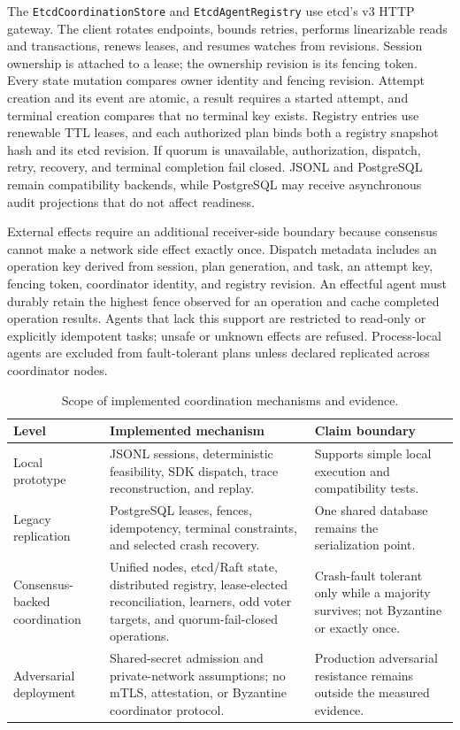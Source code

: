 The \texttt{EtcdCoordinationStore} and \texttt{EtcdAgentRegistry} use etcd's v3 HTTP gateway. The client rotates endpoints, bounds retries, performs linearizable reads and transactions, renews leases, and resumes watches from revisions. Session ownership is attached to a lease; the ownership revision is its fencing token. Every state mutation compares owner identity and fencing revision. Attempt creation and its event are atomic, a result requires a started attempt, and terminal creation compares that no terminal key exists. Registry entries use renewable TTL leases, and each authorized plan binds both a registry snapshot hash and its etcd revision. If quorum is unavailable, authorization, dispatch, retry, recovery, and terminal completion fail closed. JSONL and PostgreSQL remain compatibility backends, while PostgreSQL may receive asynchronous audit projections that do not affect readiness.

External effects require an additional receiver-side boundary because consensus cannot make a network side effect exactly once. Dispatch metadata includes an operation key derived from session, plan generation, and task, an attempt key, fencing token, coordinator identity, and registry revision. An effectful agent must durably retain the highest fence observed for an operation and cache completed operation results. Agents that lack this support are restricted to read-only or explicitly idempotent tasks; unsafe or unknown effects are refused. Process-local agents are excluded from fault-tolerant plans unless declared replicated across coordinator nodes.

\begin{table}[htbp]
\centering
\caption{Scope of implemented coordination mechanisms and evidence.}
\label{tab:implementation-scope}
\small
\begin{tabular}{p{}p{}p{}}
\toprule
\textbf{Level} & \textbf{Implemented mechanism} & \textbf{Claim boundary} \\
\midrule
Local prototype & JSONL sessions, deterministic feasibility, SDK dispatch, trace reconstruction, and replay. & Supports simple local execution and compatibility tests. \\
Legacy replication & PostgreSQL leases, fences, idempotency, terminal constraints, and selected crash recovery. & One shared database remains the serialization point. \\
Consensus-backed coordination & Unified nodes, etcd/Raft state, distributed registry, lease-elected reconciliation, learners, odd voter targets, and quorum-fail-closed operations. & Crash-fault tolerant only while a majority survives; not Byzantine or exactly once. \\
Adversarial deployment & Shared-secret admission and private-network assumptions; no mTLS, attestation, or Byzantine coordinator protocol. & Production adversarial resistance remains outside the measured evidence. \\
\bottomrule
\end{tabular}
\end{table}

